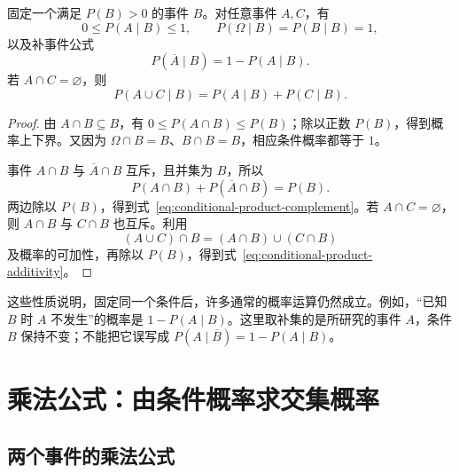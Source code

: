 \documentclass[UTF8,12pt,a4paper,fontset=fandol]{ctexart}
\begin{document}
\begin{proposition}[条件概率的基本性质]
\label{prop:conditional-product-properties}
固定一个满足 $P(B)>0$ 的事件 $B$。对任意事件 $A,C$，有
\begin{equation}
  0\le P(A\mid B)\le1,\qquad
  P(\Omega\mid B)=P(B\mid B)=1,
  \label{eq:conditional-product-bounds}
\end{equation}
以及补事件公式
\begin{equation}
  P(\overline A\mid B)=1-P(A\mid B).
  \label{eq:conditional-product-complement}
\end{equation}
若 $A\cap C=\varnothing$，则
\begin{equation}
  P(A\cup C\mid B)=P(A\mid B)+P(C\mid B).
  \label{eq:conditional-product-additivity}
\end{equation}
\end{proposition}
\begin{proof}
由 $A\cap B\subseteq B$，有 $0\le P(A\cap B)\le P(B)$；除以正数 $P(B)$，得到概率上下界。又因为 $\Omega\cap B=B$、$B\cap B=B$，相应条件概率都等于 $1$。

事件 $A\cap B$ 与 $\overline A\cap B$ 互斥，且并集为 $B$，所以
\[
  P(A\cap B)+P(\overline A\cap B)=P(B).
\]
两边除以 $P(B)$，得到式~\eqref{eq:conditional-product-complement}。若 $A\cap C=\varnothing$，则 $A\cap B$ 与 $C\cap B$ 也互斥。利用
\[
  (A\cup C)\cap B=(A\cap B)\cup(C\cap B)
\]
及概率的可加性，再除以 $P(B)$，得到式~\eqref{eq:conditional-product-additivity}。
\end{proof}

这些性质说明，固定同一个条件后，许多通常的概率运算仍然成立。例如，“已知 $B$ 时 $A$ 不发生”的概率是 $1-P(A\mid B)$。这里取补集的是所研究的事件 $A$，条件 $B$ 保持不变；不能把它误写成 $P(A\mid\overline B)=1-P(A\mid B)$。

\section{乘法公式：由条件概率求交集概率}
\label{sec:conditional-product-rule}

\subsection{两个事件的乘法公式}
\end{document}
